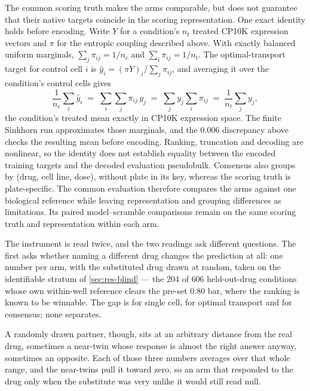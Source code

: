 The common scoring truth makes the arms comparable, but does not guarantee
that their native targets coincide in the scoring representation. One exact
identity holds before encoding. Write $Y$ for a condition's $n_t$ treated
CP10K expression vectors and $\pi$ for the entropic coupling described above.
With exactly balanced uniform marginals,
$\sum_j \pi_{ij} = 1/n_c$ and $\sum_i \pi_{ij} = 1/n_t$. The optimal-transport
target for control cell $i$ is $\hat{y}_i = (\pi Y)_i \big/ \sum_j \pi_{ij}$, and
averaging it over the condition's control cells gives
\begin{equation}
 \frac{1}{n_c}\sum_{i} \hat{y}_i
 \;=\; \sum_{i}\sum_{j} \pi_{ij}\, y_j
 \;=\; \sum_{j} y_j \sum_{i} \pi_{ij}
 \;=\; \frac{1}{n_t}\sum_{j} y_j ,
\end{equation}
the condition's treated mean exactly in CP10K expression space. The finite
Sinkhorn run approximates those marginals, and the $0.006$ discrepancy above
checks the resulting mean before encoding. Ranking, truncation and decoding
are nonlinear, so the identity does not establish equality between the
encoded training targets and the decoded evaluation pseudobulk. Consensus
also groups by (drug, cell line, dose), without plate in its key, whereas the
scoring truth is plate-specific. The common evaluation therefore compares
the arms against one biological reference while leaving representation and
grouping differences as limitations. Its paired model--scramble comparisons
remain on the same scoring truth and representation within each arm.

The instrument is read twice, and the two readings ask different questions. The
first asks whether naming a different drug changes the prediction at all: one
number per arm, with the substituted drug drawn at random, taken on the
identifiable stratum of \cref{sec:res-blind} --- the $\num{204}$ of $\num{606}$
held-out-drug conditions whose own within-well reference clears the pre-set
$0.80$ bar, where the ranking is known to be winnable. The gap is
 for single cell,  for
optimal transport and  for consensus; none separates.

A randomly drawn partner, though, sits at an arbitrary distance from the real drug, sometimes a near-twin whose response is almost the right answer anyway,
sometimes an opposite. Each of those three numbers averages over that whole
range, and the near-twins pull it toward zero, so an arm that responded to the
drug only when the substitute was very unlike it would still read null.

